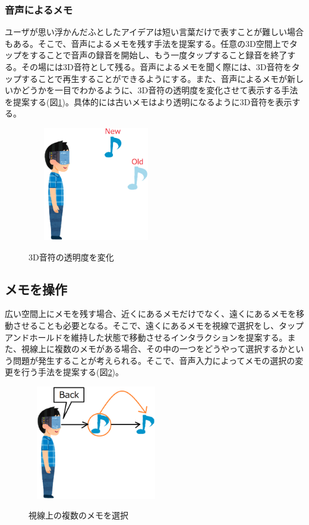 \documentclass{hissymp}
\begin{document}
\subsubsection{音声によるメモ}
ユーザが思い浮かんだふとしたアイデアは短い言葉だけで表すことが難しい場合もある。そこで、音声によるメモを残す手法を提案する。任意の3D空間上でタップをすることで音声の録音を開始し、もう一度タップすること録音を終了する。その場には3D音符として残る。音声によるメモを聞く際には、3D音符をタップすることで再生することができるようにする。また、音声によるメモが新しいかどうかを一目でわかるように、3D音符の透明度を変化させて表示する手法を提案する(図\ref{fig:onpu_memo})。具体的には古いメモはより透明になるように3D音符を表示する。

\begin{figure}[h]
  \begin{center}
    \includegraphics[clip,height=5.0cm,width=6.0cm]{./onpu_memo.eps}
    \caption{3D音符の透明度を変化}
    \label{fig:onpu_memo}
  \end{center}
\end{figure}

\subsection{メモを操作}
広い空間上にメモを残す場合、近くにあるメモだけでなく、遠くにあるメモを移動させることも必要となる。そこで、遠くにあるメモを視線で選択をし、タップアンドホールドを維持した状態で移動させるインタラクションを提案する。また、視線上に複数のメモがある場合、その中の一つをどうやって選択するかという問題が発生することが考えられる。そこで、音声入力によってメモの選択の変更を行う手法を提案する(図\ref{fig:sentaku_memo})。

\begin{figure}[h]
  \begin{center}
    \includegraphics[clip,height=5.0cm,width=6.0cm]{./sentaku_memo.eps}
    \caption{視線上の複数のメモを選択}
    \label{fig:sentaku_memo}
  \end{center}
\end{figure}
\end{document}
